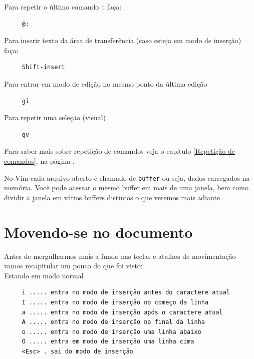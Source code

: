 \documentclass[10pt,a4paper,openany]{book}
\begin{document}
Para repetir o último comando \verb+:+ faça:

\begin{verbatim}
     @:
\end{verbatim}

Para inserir texto da área de transferência (caso esteja em modo de inserção) faça:

\begin{verbatim}
     Shift-insert
\end{verbatim}

Para entrar em modo de edição no mesmo ponto da última edição

\begin{verbatim}
     gi
\end{verbatim}

Para repetir uma seleção (visual)

\begin{verbatim}
     gv
\end{verbatim}

Para saber mais sobre repetição de comandos veja o capítulo \ref{Repetição de comandos},
na página \pageref{Repetição de comandos}.

No Vim cada arquivo aberto é chamado de \verb|buffer| ou seja, dados
carregados na memória. Você pode acessar o mesmo buffer em mais de uma
janela, bem como dividir a janela em vários buffers distintos o que veremos
mais adiante.

\chapter{Movendo-se no documento}\label{cha:Movendo-se no documento}

Antes de mergulharmos mais a fundo nas teclas e atalhos de
movimentação vamos recapitular um pouco do que foi visto: \\



Estando em modo normal

\begin{verbatim}
     i ..... entra no modo de inserção antes do caractere atual
     I ..... entra no modo de inserção no começo da linha
     a ..... entra no modo de inserção após o caractere atual
     A ..... entra no modo de inserção no final da linha
     o ..... entra no modo de inserção uma linha abaixo
     O ..... entra em modo de inserção uma linha cima
     <Esc> . sai do modo de inserção
\end{verbatim}
\end{document}
